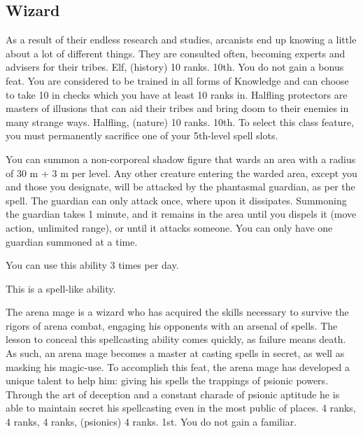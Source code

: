 \subsection{Wizard}
{As a result of their endless research and studies, arcanists end up knowing a little about a lot of different things. They are consulted often, becoming experts and advisers for their tribes.}
{Elf,  (history) 10 ranks.}
{10th.}
{You do not gain a bonus feat.}
{
	You are considered to be trained in all forms of Knowledge and can choose to take 10 in  checks which you have at least 10 ranks in.
}
{Halfling protectors are masters of illusions that can aid their tribes and bring doom to their enemies in many strange ways.}
{Halfling,  (nature) 10 ranks.}
{10th.}
{To select this class feature, you must permanently sacrifice one of your 5th-level spell slots.}
{
	You can summon a non-corporeal shadow figure that wards an area with a radius of 30 m + 3 m per level. Any other creature entering the warded area, except you and those you designate, will be attacked by the phantasmal guardian, as per the  spell. The guardian can only attack once, where upon it dissipates. Summoning the guardian takes 1 minute, and it remains in the area until you dispels it (move action, unlimited range), or until it attacks someone. You can only have one guardian summoned at a time.

	You can use this ability 3 times per day.

	This is a spell-like ability.
}
{The arena mage is a wizard who has acquired the skills necessary to survive the rigors of arena combat, engaging his opponents with an arsenal of spells. The lesson to conceal this spellcasting ability comes quickly, as failure means death. As such, an arena mage becomes a
master at casting spells in secret, as well as masking his magic-use. To accomplish this feat, the arena mage has developed a unique talent to help him: giving his spells the trappings of psionic powers. Through the art of deception and a constant charade of psionic aptitude he is able to maintain secret his spellcasting even in the most public of places.}
{ 4 ranks,  4 ranks,  4 ranks,  (psionics) 4 ranks.}
{1st.}
{You do not gain a familiar.}
